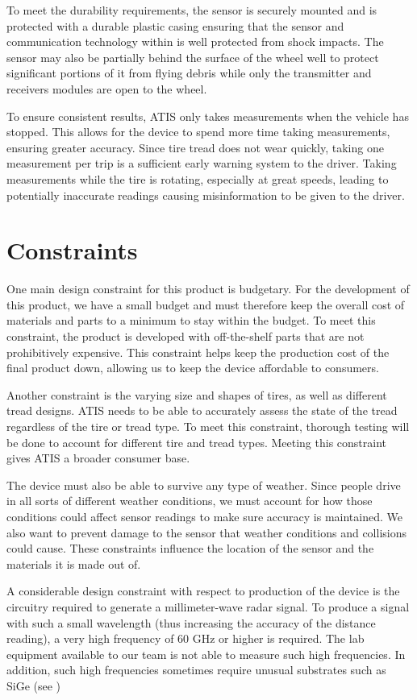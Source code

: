 \documentclass[11pt]{IEEEtran}
\begin{document}
			To meet the durability requirements, the sensor is securely mounted and is protected with a durable plastic casing ensuring that the sensor and communication technology within is well protected from shock impacts. The sensor may also be partially behind the surface of the wheel well to protect significant portions of it from flying debris while only the transmitter and receivers modules are open to the wheel.

			To ensure consistent results, ATIS only takes measurements when the vehicle has stopped. This allows for the device to spend more time taking measurements, ensuring greater accuracy. Since tire tread does not wear quickly, taking one measurement per trip is a sufficient early warning system to the driver. Taking measurements while the tire is rotating, especially at great speeds, leading to potentially inaccurate readings causing misinformation to be given to the driver.


	\section{Constraints}
		One main design constraint for this product is budgetary. For the development of this product, we have a small budget and must therefore keep the overall cost of materials and parts to a minimum to stay within the budget. To meet this constraint, the product is developed with off-the-shelf parts that are not prohibitively expensive. This constraint helps keep the production cost of the final product down, allowing us to keep the device affordable to consumers. 

		Another constraint is the varying size and shapes of tires, as well as different tread designs. ATIS needs to be able to accurately assess the state of the tread regardless of the tire or tread type. To meet this constraint, thorough testing will be done to account for different tire and tread types. Meeting this constraint gives ATIS a broader consumer base.

		The device must also be able to survive any type of weather. Since people drive in all sorts of different weather conditions, we must account for how those conditions could affect sensor readings to make sure accuracy is maintained. We also want to prevent damage to the sensor that weather conditions and collisions could cause. These constraints influence the location of the sensor and the materials it is made out of.

		A considerable design constraint with respect to production of the device is the circuitry required to generate a millimeter-wave radar signal. To produce a signal with such a small wavelength (thus increasing the accuracy of the distance reading), a very high frequency of 60 GHz or higher is required. The lab equipment available to our team is not able to measure such high frequencies. In addition, such high frequencies sometimes require unusual substrates such as SiGe (see \cite{122ghz,240ghz})
\end{document}
